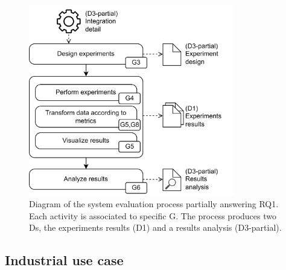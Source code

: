 \begin{figure}[!ht]
    \begin{center}
    \includegraphics[width=0.8\textwidth]{figures/3-method/method_exp.png}
    \caption[System evaluation process - Hudi vs. Iceberg]{Diagram of the system evaluation process partially answering \gls{RQ}1. Each activity is associated to specific \gls{G}. The process produces two \glspl{D}, the experiments results (\gls{D}1) and a results analysis (\gls{D}3-partial).}
    \label{fig:method_experiments}
    \end{center}
\end{figure}


\subsection{Industrial use case}
\label{subsec:method_use_case}

